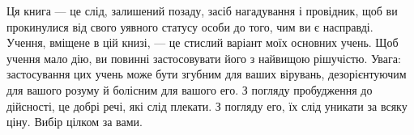Ця книга — це слід, залишений позаду, засіб нагадування і провідник, щоб ви прокинулися від свого уявного статусу особи до того, чим ви є насправді. Учення, вміщене в цій книзі, — це стислий варіант моїх основних учень. Щоб учення мало дію, ви повинні застосовувати його з найвищою рішучістю. Увага: застосування цих учень може бути згубним для ваших вірувань, дезорієнтуючим для вашого розуму й болісним для вашого его. З погляду пробудження до дійсності, це добрі речі, які слід плекати. З погляду его, їх слід уникати за всяку ціну. Вибір цілком за вами.
